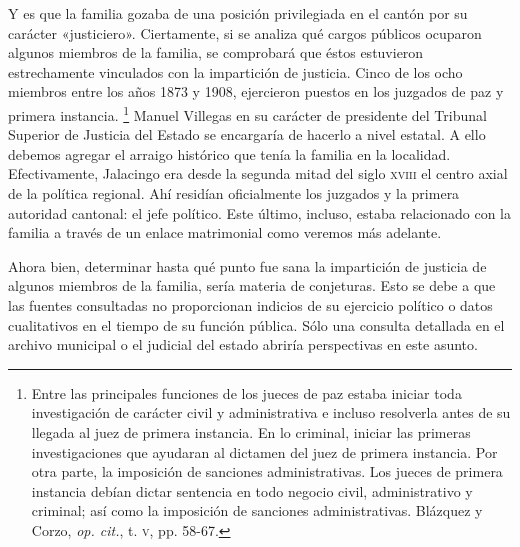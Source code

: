 \documentclass[14pt,twoside,final]{extbook} %
\let\oldfootnote\footnote
\renewcommand\footnote[1]{%
\oldfootnote{\hspace{1mm}#1}}
\begin{document}
Y es que la familia gozaba de una posición privilegiada en el cantón por su carácter «justiciero». Ciertamente, si se analiza qué cargos públicos ocuparon algunos miembros de la familia, se comprobará que éstos estuvieron estrechamente vinculados con la impartición de justicia. Cinco de los ocho miembros entre los años 1873 y 1908, ejercieron puestos en los juzgados de paz y primera instancia.\footnote{Entre las principales funciones de los jueces de paz estaba iniciar toda investigación de carácter civil y administrativa e incluso resolverla antes de su llegada al juez de primera instancia. En lo criminal, iniciar las primeras investigaciones que ayudaran al dictamen del juez de primera instancia. Por otra parte, la imposición de sanciones administrativas. Los jueces de primera instancia debían dictar sentencia en todo negocio civil, administrativo y criminal; así como la imposición de sanciones administrativas. Blázquez y Corzo, \emph{op. cit.}, t. \textsc{v}, pp. 58-67.} Manuel Villegas en su carácter de presidente del Tribunal Superior de Justicia del Estado se encargaría de hacerlo a nivel estatal. A ello debemos agregar el arraigo histórico que tenía la familia en la localidad. Efectivamente, Jalacingo era desde la segunda mitad del siglo \textsc{xviii} el centro axial de la política regional. Ahí residían oficialmente los juzgados y la primera autoridad cantonal: el jefe político. Este último, incluso, estaba relacionado con la familia a través de un enlace matrimonial como veremos más adelante.

Ahora bien, determinar hasta qué punto fue sana la impartición de justicia de algunos miembros de la familia, sería materia de conjeturas. Esto se debe a que las fuentes consultadas no proporcionan indicios de su ejercicio político o datos cualitativos en el tiempo de su función pública. Sólo una consulta detallada en el archivo municipal o el judicial del estado abriría perspectivas en este asunto.
\end{document}
